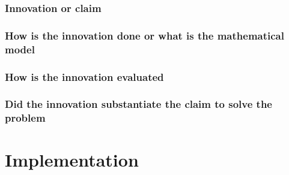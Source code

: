 \documentclass[10pt,twocolumn,letterpaper]{article}
\begin{document}
\subsubsection{Innovation or claim}
\lipsum[1]

\subsubsection{How is the innovation done or what is the mathematical model}
\lipsum[1]

\subsubsection{How is the innovation evaluated}
\lipsum[1]

\subsubsection{Did the innovation substantiate the claim to solve the problem}
\lipsum[1]

\section{Implementation}
\lipsum


{\small
 

}
\end{document}
